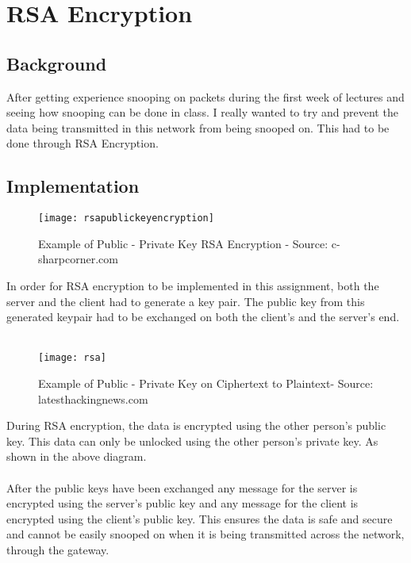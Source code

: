 \documentclass[10pt]{article}
\begin{document}
\section{RSA Encryption}
	\subsection{Background}
	After getting experience snooping on packets during the first week of lectures and seeing how snooping can be done in class. I really wanted to try and prevent the data being transmitted in this network from being snooped on. This had to be done through RSA Encryption.
	\subsection{Implementation}
	\begin{description}
		\item
		\begin{figure}[h!]
			\texttt{[image: rsapublickeyencryption]}
			\caption{Example of Public - Private Key RSA Encryption - Source: c-sharpcorner.com}
			\label{fig:rsaEncryption}
		\end{figure}
	\end{description}
In order for RSA encryption to be implemented in this assignment, both the server and the client had to generate a key pair. The public key from this generated keypair had to be exchanged on both the client's and the server's end.\\\\
	\begin{description}
	\item
	\begin{figure}[h!]
		\begin{center}	
		\texttt{[image: rsa]}
		\end{center}
		\caption{Example of Public - Private Key on Ciphertext to Plaintext- Source: latesthackingnews.com}
		\label{fig:rsaEncryption}
	\end{figure}
\end{description}
During RSA encryption, the data is encrypted using the other person's public key. This data can only be unlocked using the other person's private key. As shown in the above diagram.\\\\
After the public keys have been exchanged any message for the server is encrypted using the server's public key and any message for the client is encrypted using the client's public key. This ensures the data is safe and secure and cannot be easily snooped on when it is being transmitted across the network, through the gateway.\newpage
\end{document}
